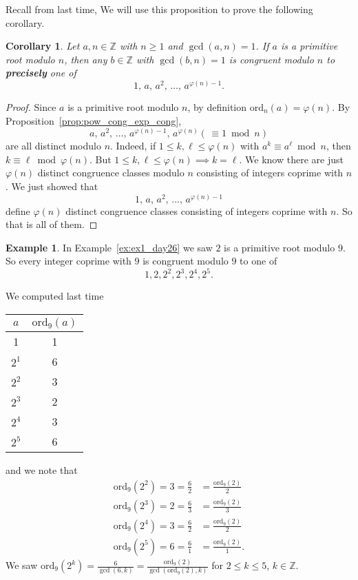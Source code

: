 \documentclass{amsbook}
\theoremstyle{plain}
\newtheorem{corollary}[theorem]{Corollary}
\theoremstyle{definition}
\newtheorem{example}[theorem]{Example}
\theoremstyle{remark}
\numberwithin{equation}{chapter}
\numberwithin{figure}{chapter}
\newcommand{\Z}{\mathbb{Z}}
\newcommand*{\ord}{\text{ord}}
\begin{document}
Recall from last time,
\powcongexpcong*
We will use this proposition to prove the following corollary.
\begin{corollary}\label{cor:coprime_cong_prim_rt_power}
  Let $a, n \in \Z$ with $n \geqslant 1$ and $\gcd (a, n) = 1$. If $a$ is a primitive root modulo $n$, then any $b \in \Z$ with $\gcd (b, n) = 1$ is congruent modulo $n$ to \textbf{precisely} one of
  \[
    1,\, a, \, a^2, \,\ldots,\, a^{\varphi(n) - 1}.
  \]
\end{corollary}
\begin{proof}
  Since $a$ is a primitive root modulo $n$, by definition $\ord_n (a) = \varphi (n)$. By Proposition~\ref{prop:pow_cong_exp_cong},
  \[
    a, \, a^2, \,\ldots,\, a^{\varphi(n) - 1}, \, a^{\varphi(n)} (\,\equiv 1 \bmod n)
  \]
  are all distinct modulo $n$. Indeed, if $1 \leqslant k, \ell \leqslant \varphi (n)$ with $a^k \equiv a^{\ell} \bmod n$, then $k \equiv \ell \bmod \varphi(n)$. But $1 \leqslant k, \ell \leqslant \varphi (n) \implies k = \ell$. We know there are just $\varphi (n)$ distinct congruence classes modulo $n$ consisting of integers coprime with $n$. We just showed that
  \[
    1,\, a, \, a^2, \,\ldots,\, a^{\varphi(n) - 1}
  \]
  define $\varphi (n)$ distinct congruence classes consisting of integers coprime with $n$. So that is all of them.
\end{proof}

\begin{example}
  In Example~\ref{ex:ex1_day26} we saw $2$ is a primitive root modulo $9$. So every integer coprime with $9$ is congruent modulo $9$ to one of
\[
  1, 2, 2^2, 2^3, 2^4, 2^5.
\]
\end{example}

We computed last time
\begin{center}
\begin{tabular}{c|c} \hline
  $a$ & $\ord_9 (a)$ \\ \hline
  1 & 1 \\
  $2^1$ & 6 \\
  $2^2$ & 3 \\
  $2^3$ & 2 \\
  $2^4$ & 3 \\
  $2^5$ & 6 \\ \hline
\end{tabular}
\end{center}
and we note that
\begin{align}
  \ord_9 (2^2) = 3 = \frac{6}2 &= \frac{\ord_9 (2)}2 \\
  \ord_9 (2^3) = 2 = \frac{6}3 &= \frac{\ord_9 (2)}3 \\
  \ord_9 (2^4) = 3 = \frac{6}2 &= \frac{\ord_9 (2)}2 \\
  \ord_9 (2^5) = 6 = \frac{6}1 &= \frac{\ord_9 (2)}1.
\end{align}
We saw $\displaystyle \ord_9 (2^k) = \frac{6}{\gcd (6, k)} = \frac{\ord_9 (2)}{\gcd (\ord_9 (2), k)}$ for $2 \leqslant k \leqslant 5$, $k \in \Z$.
\end{document}
